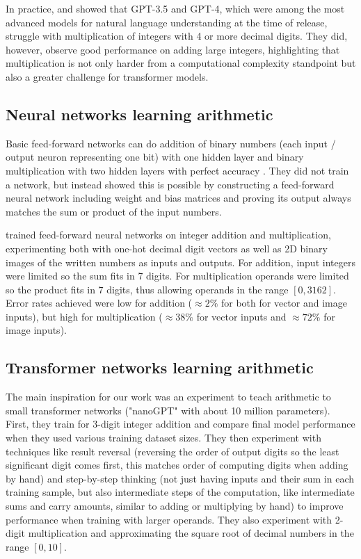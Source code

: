 In practice,\cite{openai2023gpt4} and  showed that GPT-3.5 and GPT-4, which were among the most advanced models for natural language understanding at the time of release, struggle with multiplication of integers with 4 or more decimal digits. They did, however, observe good performance on adding large integers, highlighting that multiplication is not only harder from a computational complexity standpoint but also a greater challenge for transformer models.

\subsection{Neural networks learning arithmetic}

 Basic feed-forward networks can do addition of binary numbers (each input / output neuron representing one bit) with one hidden layer and binary multiplication with two hidden layers with perfect accuracy \cite{solving}. They did not train a network, but instead showed this is possible by constructing a feed-forward neural network including weight and bias matrices and proving its output always matches the sum or product of the input numbers.

\cite{visual} trained feed-forward neural networks on integer addition and multiplication, experimenting both with one-hot decimal digit vectors as well as 2D binary images of the written numbers as inputs and outputs. For addition, input integers were limited so the sum fits in 7 digits. For multiplication operands were limited so the product fits in 7 digits, thus allowing operands in the range $[0, 3162]$. Error rates achieved were low for addition ($\approx 2\%$ for both for vector and image inputs), but high for multiplication ($\approx 38\%$ for vector inputs and $\approx 72\%$ for image inputs).

\subsection{Transformer networks learning arithmetic}

The main inspiration for our work was an experiment \cite{teaching}  to teach arithmetic to small transformer networks ("nanoGPT" with about 10 million parameters). First, they train for 3-digit integer addition and compare final model performance when they used various training dataset sizes. They then experiment with techniques like result reversal (reversing the order of output digits so the least significant digit comes first, this matches order of computing digits when adding by hand) and step-by-step thinking (not just having inputs and their sum in each training sample, but also intermediate steps of the computation, like intermediate sums and carry amounts, similar to adding or multiplying by hand) to improve performance when training with larger operands. They also experiment with 2-digit multiplication and approximating the square root of decimal numbers in the range $[0,10]$.

